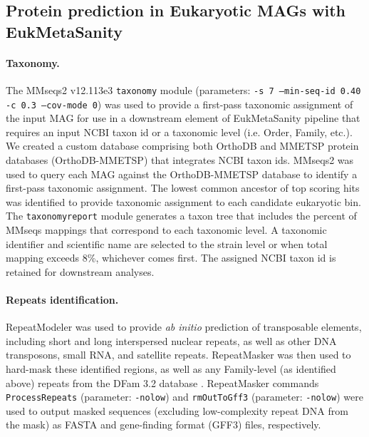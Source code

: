 \documentclass[12pt]{article}
\numberwithin{equation}{section}
\begin{document}
\subsection*{Protein prediction in Eukaryotic MAGs with EukMetaSanity} 
\paragraph{Taxonomy.} The MMseqs2 v12.113e3 \citep{Steinegger2017, Steinegger2018, Mirdita2019} \texttt{taxonomy} module (parameters: \texttt{-s 7 --min-seq-id 0.40 -c 0.3 --cov-mode 0}) was used to provide a first-pass taxonomic assignment of the input MAG for use in a downstream element of EukMetaSanity pipeline that requires an input NCBI taxon id or a taxonomic level (i.e. Order, Family, etc.). We created a custom database comprising both OrthoDB \citep{Kriventseva2018} and MMETSP \citep{Keeling2014} protein databases (OrthoDB-MMETSP) that integrates NCBI taxon ids. MMseqs2 was used to query each MAG against the OrthoDB-MMETSP database to identify a first-pass taxonomic assignment. The lowest common ancestor of top scoring hits was identified to provide taxonomic assignment to each candidate eukaryotic bin. The \texttt{taxonomyreport} module generates a taxon tree that includes the percent of MMseqs mappings that correspond to each taxonomic level. A taxonomic identifier and scientific name are selected to the strain level or when total mapping exceeds 8\%, whichever comes first. The assigned NCBI taxon id is retained for downstream analyses. 

\paragraph{Repeats identification.} RepeatModeler \citep{Flynn-RM, RepeatModeler} was used to provide \textit{ab initio} prediction of transposable elements, including short and long interspersed nuclear repeats, as well as other DNA transposons, small RNA, and satellite repeats. RepeatMasker \citep{RepeatMasker} was then used to hard-mask these identified regions, as well as any Family-level (as identified above) repeats from the DFam 3.2 database \citep{Flynn2020}. RepeatMasker commands \texttt{ProcessRepeats} (parameter: \texttt{-nolow}) and \texttt{rmOutToGff3} (parameter: \texttt{-nolow}) were used to output masked sequences (excluding low-complexity repeat DNA from the mask) as FASTA and gene-finding format (GFF3) files, respectively. 
\end{document}

